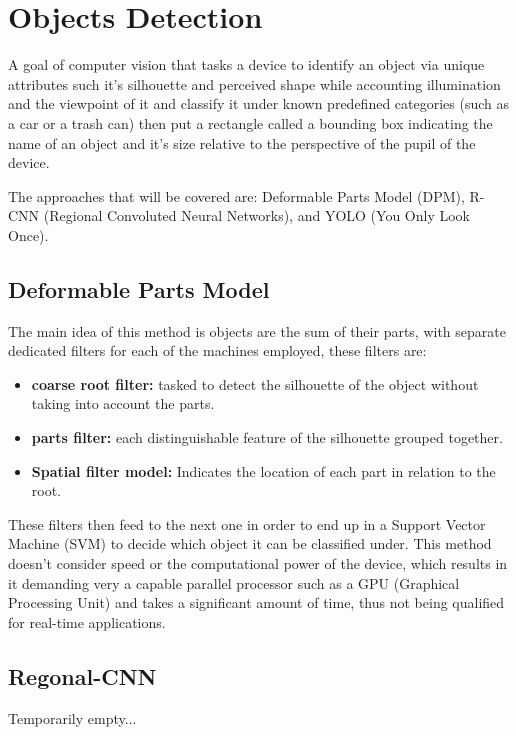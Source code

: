 
\section{Objects Detection}
A goal of computer vision that tasks a device to identify an object via unique attributes such it's silhouette and perceived shape while accounting illumination and the viewpoint of it and classify it under known predefined categories (such as a car or a trash can) then put a rectangle called a bounding box indicating the name of an object and it's size relative to the  perspective of the pupil of the device.

The approaches that will be covered are: Deformable Parts Model (DPM), R-CNN (Regional Convoluted Neural Networks), and YOLO (You Only Look Once).

\subsection{Deformable Parts Model}
The main idea of this method is objects are the sum of their parts, with separate dedicated filters for each of the machines employed, these filters are:

\begin{itemize}
\item \textbf{coarse root filter:} tasked to detect the silhouette of the object without taking
into account the parts.
\item \textbf{parts filter:} each distinguishable feature of the silhouette grouped together.
\item \textbf{Spatial filter model:} Indicates the location of each part in relation to the root.
\end{itemize}

These filters then feed to the next one in order to end up in a Support Vector Machine (SVM) to decide which object it can be classified under. This method doesn't consider speed or the computational power of the device, which results in it demanding very a capable parallel processor such as a GPU (Graphical Processing Unit) and takes a significant amount of time, thus not being qualified for real-time applications.

\subsection{Regonal-CNN}
\color{red}Temporarily empty...\color{black}

